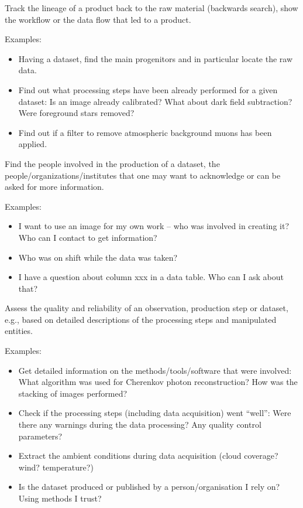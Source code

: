         Track the lineage of a product back to the raw material (backwards search), show the
        workflow or the data flow that led to a product.

        \noindent Examples: 
        \begin{itemize}
            \item Having a dataset, find the main progenitors and in particular locate the raw data.
            \item Find out what processing steps have been already performed for a given dataset: Is an image already calibrated? What about dark field subtraction? Were foreground stars removed?
            \item Find out if a filter to remove atmospheric background muons has been applied.
        \end{itemize}


        Find the people involved in the production of a dataset, the people\slash{}organizations\slash{}institutes that one may want to acknowledge or can be asked for more information.

        \noindent Examples: 
        \begin{itemize}
            \item I want to use an image for my own work -- who was involved in creating it? Who can I contact to get information? 
            \item Who was on shift while the data was taken?
            \item I have a question about column xxx in a data table. Who can I ask about that? 
        \end{itemize}


Assess the quality and reliability of an observation, production step or dataset, e.g., based on detailed descriptions of the processing steps and manipulated entities.
        
        \noindent Examples:
        \begin{itemize}
            \item Get detailed information on the methods/tools/software that were involved: What algorithm was used for Cherenkov photon reconstruction? How was the stacking of images performed?
            \item Check if the processing steps (including data acquisition) went ``well'': Were there any warnings during the data processing? Any quality control parameters?
            \item Extract the ambient conditions during data acquisition (cloud coverage? wind? temperature?)
            \item Is the dataset produced or published by a person/organisation I rely on? Using methods I trust?
        \end{itemize}


